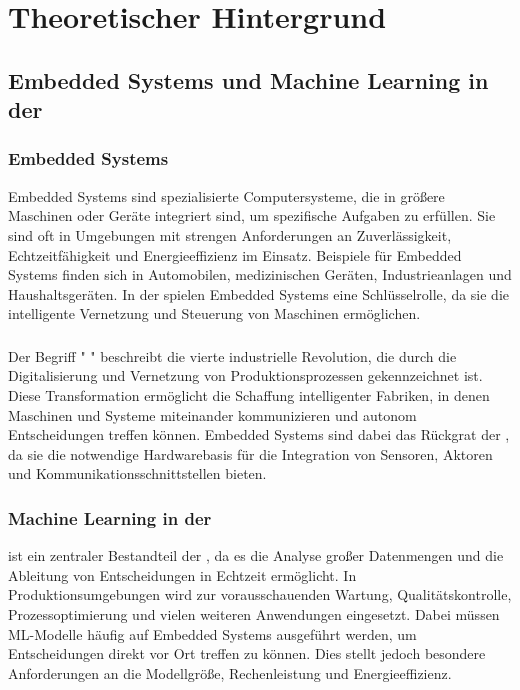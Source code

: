 \chapter{Theoretischer Hintergrund}
\label{chap:theoretische_hintergrund}

\section{Embedded Systems und Machine Learning in der \Iviernull}

\subsection{Embedded Systems}

Embedded Systems sind spezialisierte Computersysteme, die in größere Maschinen oder Geräte integriert sind,
um spezifische Aufgaben zu erfüllen. Sie sind oft in Umgebungen mit strengen Anforderungen an Zuverlässigkeit, 
Echtzeitfähigkeit und Energieeffizienz im Einsatz. Beispiele für Embedded Systems finden sich in Automobilen, 
medizinischen Geräten, Industrieanlagen und Haushaltsgeräten. In der \Iviernull spielen Embedded Systems eine Schlüsselrolle, 
da sie die intelligente Vernetzung und Steuerung von Maschinen ermöglichen.

\subsection{\Iviernull}

Der Begriff " \Iviernull" beschreibt die vierte industrielle Revolution, die durch die Digitalisierung und Vernetzung 
von Produktionsprozessen gekennzeichnet ist. Diese Transformation ermöglicht die Schaffung intelligenter Fabriken, 
in denen Maschinen und Systeme miteinander kommunizieren und autonom Entscheidungen treffen können. Embedded Systems 
sind dabei das Rückgrat der \Iviernull, da sie die notwendige Hardwarebasis für die Integration von Sensoren, 
Aktoren und Kommunikationsschnittstellen bieten.

\subsection{Machine Learning in der \Iviernull}

\ML ist ein zentraler Bestandteil der \Iviernull, da es die Analyse großer Datenmengen und die Ableitung 
von Entscheidungen in Echtzeit ermöglicht. In Produktionsumgebungen wird \ML zur vorausschauenden Wartung, 
Qualitätskontrolle, Prozessoptimierung und vielen weiteren Anwendungen eingesetzt. Dabei müssen ML-Modelle häufig auf 
Embedded Systems ausgeführt werden, um Entscheidungen direkt vor Ort treffen zu können. Dies stellt jedoch besondere Anforderungen 
an die Modellgröße, Rechenleistung und Energieeffizienz.

